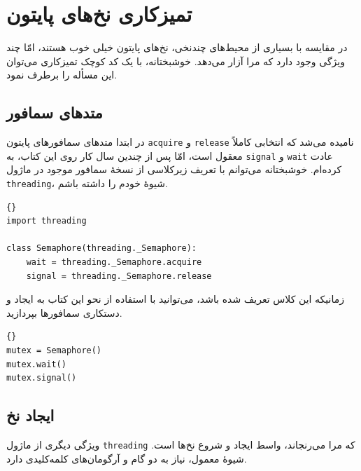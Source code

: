 \documentclass{book}
\begin{document}

\setLTRbibitems



\appendix

\chapter{تمیزکاری نخ‌های پایتون}
\label{cleanup}

    در مقایسه با  بسیاری از محیط‌های چندنخی، نخ‌های پایتون خیلی خوب هستند، امّا چند ویژگی وجود دارد که مرا آزار می‌دهد. 
    خوشبختانه،‌ با یک کد کوچک تمیزکاری می‌توان این مسأله را برطرف نمود. 

\section{متدهای سمافور}

    در ابتدا متدهای سمافورهای پایتون {\tt acquire} و {\tt release} نامیده می‌شد که انتخابی کاملاً معقول است، امّا پس 
    از چندین سال کار روی این کتاب، به {\tt signal} و {\tt wait} عادت کرده‌ام. خوشبختانه می‌توانم با تعریف زیرکلاسی 
    از نسخهٔ سمافور موجود در ماژول {\tt threading}، شیوهٔ خودم را  داشته باشم. 

\begin{latin}
\begin{lstlisting}[title=\rl{تغییر نام سمافور}]{}
import threading
 
class Semaphore(threading._Semaphore):
    wait = threading._Semaphore.acquire
    signal = threading._Semaphore.release
\end{lstlisting}
\end{latin}

    زمانیکه این کلاس تعریف شده باشد، می‌توانید با استفاده از نحو این کتاب به ایجاد و دستکاری سمافورها بپردازید. 

\begin{latin}
\begin{lstlisting}[title=\rl{مثال سمافور}]{}
mutex = Semaphore()
mutex.wait()
mutex.signal()
\end{lstlisting}
\end{latin}

\section{ایجاد نخ‌}

    ویژگی دیگری از  ماژول {\tt threading} که مرا می‌رنجاند، واسط ایجاد و شروع نخ‌ها است. 
    شیوهٔ معمول، نیاز به دو گام و آرگومان‌های کلمه‌کلیدی دارد. 
\end{document}
